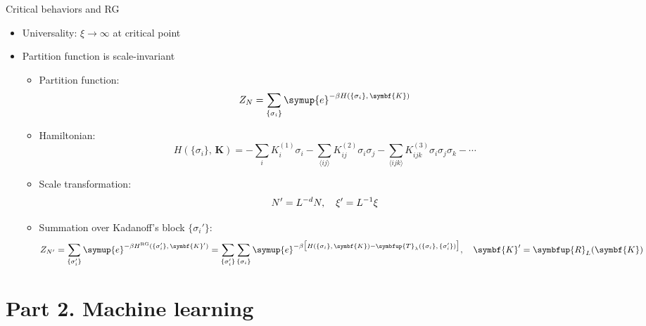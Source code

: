 \documentclass[aspectratio=169]{beamer}
\def\ee{{\symup{e}}}
\def\opT{{\symbfup{T}}}
\newcommand\trR[2][]{\symbfup{R}^{\,#1}_{#2}}
\def\bm#1{{\symbf{#1}}}
\def\nearest#1{\langle#1\rangle}
\def\q#1{{\{#1\}}}
\begin{document}
\begin{frame}{Critical behaviors and RG}
\begin{itemize}
  \item Universality: $\xi\to\infty$ at critical point
  \item Partition function is scale-invariant
    \begin{itemize}
      \item Partition function:
        \[ Z_N = \sum_\q{\sigma_i} \ee^{-\beta H(\q{\sigma_i},\,\bm{K})} \]
      \item Hamiltonian:
        \[
            H(\q{\sigma_i},\,\bm{K})
          = - \sum_i K^{(1)}_i \sigma_i
            - \sum_{\nearest{ij}}  K^{(2)}_{ij}  \sigma_i\sigma_j
            - \sum_{\nearest{ijk}} K^{(3)}_{ijk} \sigma_i\sigma_j\sigma_k - \cdots
        \]
      \item Scale transformation:
        \[ N' = L^{-d} N \qc \xi' = L^{-1} \xi \]
      \item Summation over Kadanoff's block $\q{\sigma_i'}$:
        \[
          Z_{N'}
          = \sum_\q{\sigma'_i} \ee^{-\beta H^{\text{RG}}(\q{\sigma_i'},\,\bm{K}')}
          = \sum_\q{\sigma'_i} \sum_\q{\sigma_i}
            \ee^{-\beta \qty\big[H(\q{\sigma_i},\,\bm{K})
                 -\opT_\lambda(\q{\sigma_i},\,\q{\sigma_i'})]} \qc
          \bm{K}' = \trR{L}(\bm{K})
        \]
    \end{itemize}
\end{itemize}
\end{frame}

\section{Part 2. Machine learning}
\end{document}
